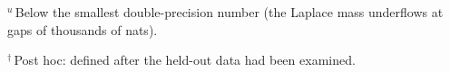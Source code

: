 \begin{table}[htbp]
\begin{minipage}{\linewidth}
$^{u}$\,Below the smallest double-precision number (the Laplace mass underflows at gaps of thousands of nats).

$^{\dagger}$\,Post hoc: defined after the held-out data had been examined.
\end{minipage}
\end{table}
